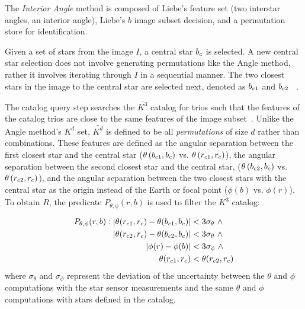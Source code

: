 \documentclass[conference]{IEEEtran}
\begin{document}
    The \textit{Interior Angle} method is composed of Liebe's feature set (two interstar angles, an interior angle),
    Liebe's $b$ image subset decision, and a permutation store for identification.

    Given a set of stars from the image $I$, a central star $b_c$ is selected.
    A new central star selection does not involve generating permutations like the Angle method, rather it involves
    iterating through $I$ in a sequential manner.
    The two closest stars in the image to the central star are selected next, denoted as $b_{c1}$ and $b_{c2}$
    ~\cite{liebe:starTrackersAttitudeDetermination}.

    The catalog query step searches the $\bar{K^3}$ catalog for trios such that the features of the catalog trios are
    close to the same features of the image subset~\cite{bratt:analysisStarIdentification}.
    Unlike the Angle method's $K^d$ set, $\bar{K^d}$ is defined to be all \textit{permutations} of size $d$ rather than
    combinations.
    These features are defined as the angular separation between the first closest star and the central star
    ($\theta\left(b_{c1}, b_c\right)$ vs. $ \theta\left(r_{c1}, r_c\right)$), the
    angular separation between the second closest star and the central star, ($\theta\left(b_{c2},
    b_c\right) $ vs. $\theta\left(r_{c2}, r_c\right)$),
    and the angular separation between the two closest stars with the central star as the origin instead of the Earth or
    focal point ($\phi(b) $ vs. $ \phi(r)$).
    To obtain $R$, the predicate $P_{\theta, \phi}(r, b)$ is used to filter the $\bar{K^3}$ catalog:

    \begin{equation}
        \begin{aligned}
            P_{\theta, \phi} (r, b): \left\lvert \theta(r_{c1}, r_c) - \theta(b_{c1}, b_c)\right\rvert
            &< 3 \sigma_{\theta} \ \land \\ \left\lvert \theta(r_{c2}, r_c) - \theta(b_{c2},
            b_c)\right\rvert &< 3 \sigma_{\theta} \ \land \\ \left\lvert \phi(r) - \phi(b)\right\rvert &< 3
            \sigma_\phi \ \land \\\theta(r_{c1}, r_c) &< \theta(r_{c2}, r_c)
        \end{aligned}
    \end{equation}
    where $\sigma_{\theta}$ and $\sigma_{\phi}$ represent the deviation of the uncertainty between the $\theta$ and $\phi$
    computations with the star sensor measurements and the same $\theta$ and $\phi$ computations with stars defined in the
    catalog.
\end{document}
